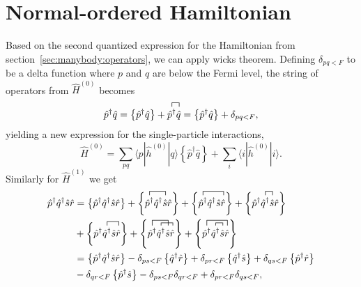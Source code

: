 \section{Normal-ordered Hamiltonian}
Based on the second quantized expression for the Hamiltonian from section~\ref{sec:manybody:operators}, we can apply wicks theorem.
Defining $\delta_{pq<F}$ to be a delta function where $p$ and $q$ are below the Fermi level, the string of operators from $\hat{H}^{(0)}$ becomes
\begin{equation}
\hat{p}^{\dagger} \hat{q}
=
\left\lbrace \hat{p}^{\dagger} \hat{q}\right\rbrace
+
\contraction[1ex]{}{\hat{p}^{\dagger}}{}{\hat{q}}
\hat{p}^{\dagger}\hat{q} 
=
\left\lbrace \hat{p}^{\dagger} \hat{q}\right\rbrace
+
\delta_{pq < F} ,
\end{equation}
yielding a new expression for the single-particle interactions,
\begin{equation}
\hat{H}^{(0)}
= 
\sum_{pq} \langle p|\hat{h}^{(0)} | q\rangle 
\left\lbrace \hat{p}^{\dagger} \hat{q} \right\rbrace
+
\sum_i \langle i | \hat{h}^{(0)} | i \rangle .
\end{equation}
Similarly for $\hat{H}^{(1)}$ we get 
\begin{equation}
\begin{split}
\hat{p}^{\dagger} \hat{q}^{\dagger} \hat{s} \hat{r}
&=
\left\lbrace \hat{p}^{\dagger} \hat{q}^{\dagger} \hat{s} \hat{r} \right\rbrace
+
\left\lbrace
\contraction[1ex]{}{\hat{p}^{\dagger}}{\hat{q}^{\dagger}}{ \hat{s}} \hat{p}^{\dagger} \hat{q}^{\dagger} \hat{s} \hat{r} \right\rbrace
+
\left\lbrace
\contraction[1ex]{}{\hat{p}^{\dagger}}{\hat{q}^{\dagger} \hat{s}}{\hat{r}} \hat{p}^{\dagger} \hat{q}^{\dagger} \hat{s} \hat{r} \right\rbrace
+
\left\lbrace
\contraction[1ex]{\hat{p}^{\dagger}}{\hat{q}^{\dagger}}{}{ \hat{s}} \hat{p}^{\dagger} \hat{q}^{\dagger} \hat{s} \hat{r} \right\rbrace  \\
&+
\left\lbrace
\contraction[1ex]{\hat{p}^{\dagger}}{\hat{q}^{\dagger}}{ \hat{s}}{\hat{r}} \hat{p}^{\dagger} \hat{q}^{\dagger} \hat{s} \hat{r} \right\rbrace 
+
\left\lbrace
\contraction[0.7ex]{\hat{p}^{\dagger}}{\hat{q}^{\dagger}}{ \hat{s}}{\hat{r}}
\contraction[1.3ex]{}{\hat{p}^{\dagger}}{\hat{q}^{\dagger}}{\hat{s}}
\hat{p}^{\dagger} \hat{q}^{\dagger} \hat{s} \hat{r} \right\rbrace
+
\left\lbrace
\contraction[0.7ex]{\hat{p}^{\dagger}}{\hat{q}^{\dagger}}{}{\hat{s}}
\contraction[1.3ex]{}{\hat{p}^{\dagger}}{\hat{q}^{\dagger}\hat{s}}{\hat{r}}
\hat{p}^{\dagger} \hat{q}^{\dagger} \hat{s} \hat{r} \right\rbrace \\
&=
\left\lbrace \hat{p}^{\dagger} \hat{q}^{\dagger} \hat{s} \hat{r} \right\rbrace
-
\delta_{ps <F} \left\lbrace \hat{q}^{\dagger} \hat{r} \right\rbrace
+ 
\delta_{pr <F} \left\lbrace \hat{q}^{\dagger} \hat{s} \right\rbrace
+
\delta_{qs <F} \left\lbrace \hat{p}^{\dagger} \hat{r} \right\rbrace \\
&-
\delta_{qr <F} \left\lbrace \hat{p}^{\dagger} \hat{s} \right\rbrace
-
\delta_{ps <F} \delta_{qr <F}
+
\delta_{pr <F} \delta_{qs <F} ,
\end{split}
\end{equation}
